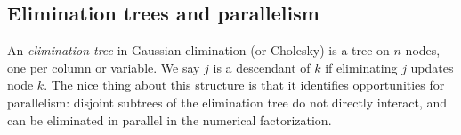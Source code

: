 \documentclass[12pt, leqno]{article} %
\begin{document}
\subsection{Elimination trees and parallelism}

An {\em elimination tree} in Gaussian elimination (or Cholesky) is a
tree on $n$ nodes, one per column or variable.  We say $j$ is a
descendant of $k$ if eliminating $j$ updates node $k$.  The nice thing
about this structure is that it identifies opportunities for
parallelism: disjoint subtrees of the elimination tree do not directly
interact, and can be eliminated in parallel in the numerical
factorization.
\end{document}
